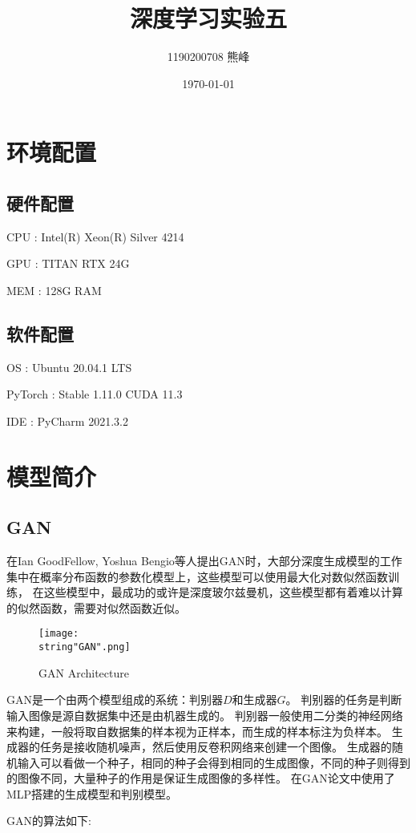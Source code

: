 \documentclass[UTF8]{ctexart}
\title{深度学习实验五}
\author{1190200708 熊峰}
\date{\today}
\begin{document}
 
\maketitle 

\newpage
\tableofcontents
\newpage

\section{环境配置}
\subsection{硬件配置}
CPU : Intel(R) Xeon(R) Silver 4214 \par
GPU : TITAN RTX 24G \par
MEM : 128G RAM  \par
\subsection{软件配置}
OS : Ubuntu 20.04.1 LTS \par
PyTorch : Stable 1.11.0  CUDA 11.3 \par
IDE : PyCharm 2021.3.2 \par


\section{模型简介}

\subsection{GAN}
在Ian GoodFellow, Yoshua Bengio等人提出GAN\cite{goodfellow2014generative}时，大部分深度生成模型的工作集中在概率分布函数的参数化模型上，这些模型可以使用最大化对数似然函数训练，
在这些模型中，最成功的或许是深度玻尔兹曼机，这些模型都有着难以计算的似然函数，需要对似然函数近似。\par 

\begin{figure}[H]
    \begin{center}
        \texttt{[image: \\string"GAN".png]}
    \caption{GAN Architecture}
    \label{fig:1}
    \end{center}
    \end{figure}
\par

GAN是一个由两个模型组成的系统：判别器$D$和生成器$G$。
判别器的任务是判断输入图像是源自数据集中还是由机器生成的。
判别器一般使用二分类的神经网络来构建，一般将取自数据集的样本视为正样本，而生成的样本标注为负样本。
生成器的任务是接收随机噪声，然后使用反卷积网络来创建一个图像。
生成器的随机输入可以看做一个种子，相同的种子会得到相同的生成图像，不同的种子则得到的图像不同，大量种子的作用是保证生成图像的多样性。
在GAN论文中使用了MLP搭建的生成模型和判别模型。\par 
GAN的算法如下:\par 
\end{document}
